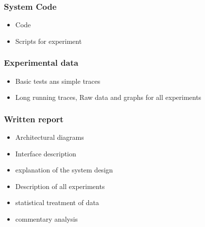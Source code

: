 \documentclass[a4paper]{article}
\begin{document}
\subsubsection{System Code}
\begin{itemize}
\item Code
\item Scripts for experiment
\end{itemize}

\subsubsection{Experimental data}
\begin{itemize}
\item Basic tests ans simple traces
\item Long running traces, Raw data and graphs for all experiments
\end{itemize}

\subsubsection{Written report}
\begin{itemize}
\item Architectural  diagrams
\item Interface description
\item explanation of the system design
\item Description of all experiments
\item statistical treatment of data
\item commentary analysis
\end{itemize}
\end{document}
